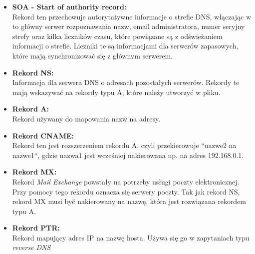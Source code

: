 \documentclass[12pt, a4paper]{article}
\begin{document}
        \begin{itemize}
            \item \textbf{SOA - Start of authority record:} \\ Rekord ten przechowuje autorytatywne informacje o strefie DNS, włączając w to główny serwer rozpoznawania nazw, email administratora, numer seryjny strefy oraz kilka liczników czasu, które powiązane są z odświeżaniem informacji o strefie. Liczniki te są informacjami dla serwerów zapasowych, które mają synchronizować się z głównym serwerem.
            \item \textbf{Rekord NS:} \\  Informacja dla serwera DNS o adresach pozostałych serwerów. Rekordy te mają wskazywać na rekordy typu A, które należy utworzyć w pliku.
            \item \textbf{Rekord A:} \\ Rekord używany do mapowania nazw na adresy.
            \item \textbf{Rekord CNAME:} \\ Rekord ten jest rozszerzeniem rekordu A, czyli przekierowuje ``nazwe2 na nazwe1``, gdzie nazwa1 jest wcześniej nakierowana np. na adres 192.168.0.1.
            \item \textbf{Rekord MX:} \\ Rekord \textit{Mail Exchange} powstały na potrzeby usługi poczty elektronicznej. Przy pomocy tego rekordu oznacza się serwery poczty. Tak jak rekord NS, rekord MX musi być nakierowany na nazwę, która jest rozwiązana rekordem typu A.
            \item \textbf{Rekord PTR:} \\ Rekord mapujący adres IP na nazwę hosta. Używa się go w zapytaniach typu \textit{reverse DNS}
        \end{itemize}
        
        
\newpage
\end{document}
